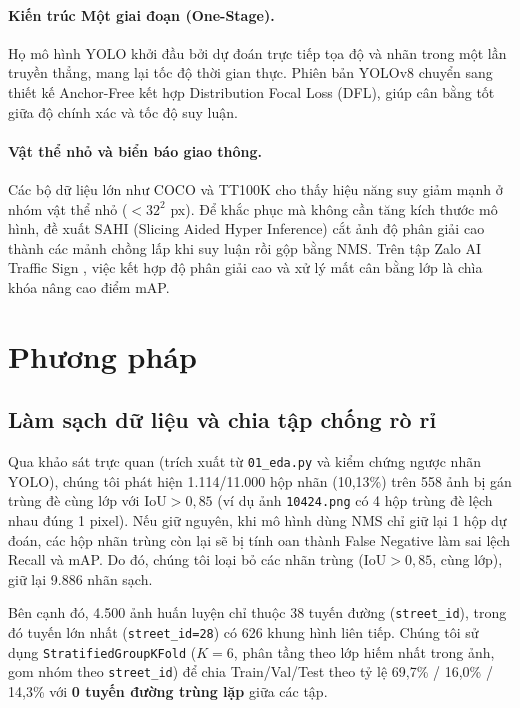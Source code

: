 \documentclass[11pt]{article}
\begin{document}
\paragraph{Kiến trúc Một giai đoạn (One-Stage).}
Họ mô hình YOLO khởi đầu bởi \citet{redmon2016yolo} dự đoán trực tiếp tọa độ và nhãn trong một lần truyền thẳng, mang lại tốc độ thời gian thực. Phiên bản YOLOv8 \citep{jocher2023yolov8} chuyển sang thiết kế Anchor-Free kết hợp Distribution Focal Loss (DFL), giúp cân bằng tốt giữa độ chính xác và tốc độ suy luận.

\paragraph{Vật thể nhỏ và biển báo giao thông.}
Các bộ dữ liệu lớn như COCO \citep{lin2014coco} và TT100K \citep{zhu2016tt100k} cho thấy hiệu năng suy giảm mạnh ở nhóm vật thể nhỏ ($<32^2$ px). Để khắc phục mà không cần tăng kích thước mô hình, \citet{akyon2022sahi} đề xuất SAHI (Slicing Aided Hyper Inference) cắt ảnh độ phân giải cao thành các mảnh chồng lấp khi suy luận rồi gộp bằng NMS. Trên tập Zalo AI Traffic Sign \citep{zalo2020traffic}, việc kết hợp độ phân giải cao và xử lý mất cân bằng lớp là chìa khóa nâng cao điểm mAP.

\section{Phương pháp}
\label{sec:method}

\subsection{Làm sạch dữ liệu và chia tập chống rò rỉ}
Qua khảo sát trực quan (trích xuất từ \texttt{01\_eda.py} và kiểm chứng ngược nhãn YOLO), chúng tôi phát hiện 1.114/11.000 hộp nhãn (10,13\%) trên 558 ảnh bị gán trùng đè cùng lớp với $\text{IoU} > 0{,}85$ (ví dụ ảnh \texttt{10424.png} có 4 hộp trùng đè lệch nhau đúng 1 pixel). Nếu giữ nguyên, khi mô hình dùng NMS chỉ giữ lại 1 hộp dự đoán, các hộp nhãn trùng còn lại sẽ bị tính oan thành False Negative làm sai lệch Recall và mAP. Do đó, chúng tôi loại bỏ các nhãn trùng ($\text{IoU} > 0{,}85$, cùng lớp), giữ lại 9.886 nhãn sạch.

Bên cạnh đó, 4.500 ảnh huấn luyện chỉ thuộc 38 tuyến đường (\texttt{street\_id}), trong đó tuyến lớn nhất (\texttt{street\_id=28}) có 626 khung hình liên tiếp. Chúng tôi sử dụng \texttt{StratifiedGroupKFold} ($K=6$, phân tầng theo lớp hiếm nhất trong ảnh, gom nhóm theo \texttt{street\_id}) để chia Train/Val/Test theo tỷ lệ 69,7\% / 16,0\% / 14,3\% với \textbf{0 tuyến đường trùng lặp} giữa các tập.
\end{document}
